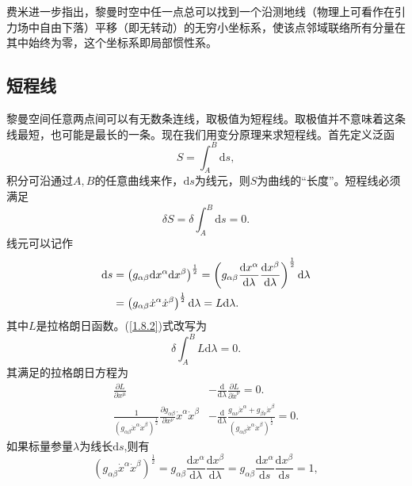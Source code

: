 \documentclass[11pt, a4paper, oneside, onecolumn]{ctexart}
\numberwithin{equation}{subsection}
\begin{document}
费米进一步指出，黎曼时空中任一点总可以找到一个沿测地线（物理上可看作在引力场中自由下落）平移（即无转动）的无穷小坐标系，使该点邻域联络所有分量在其中始终为零，这个坐标系即局部惯性系。

\subsection{短程线}
黎曼空间任意两点间可以有无数条连线，取极值为短程线。取极值并不意味着这条线最短，也可能是最长的一条。现在我们用变分原理来求短程线。首先定义泛函
\begin{equation}
S=\int_{A}^{B}\mathrm{d}s,
\end{equation}
积分可沿通过$A,B$的任意曲线来作，$\mathrm{d}s$为线元，则$S$为曲线的“长度”。短程线必须满足
\begin{equation}
\delta{}S=\delta{}\int_{A}^{B}\mathrm{d}s=0.\label{1.8.2}
\end{equation}
线元可以记作
\begin{align}
\mathrm{d}s&=\left(g_{\alpha\beta}\mathrm{d}x^{\alpha}\mathrm{d}x^{\beta}\right)^{\frac12}=\left(g_{\alpha\beta}\frac{\mathrm{d}x^{\alpha}}{\mathrm{d}\lambda}\frac{\mathrm{d}x^{\beta}}{\mathrm{d}\lambda}\right)^{\frac12}\mathrm{d}\lambda\notag\\
&=\left(g_{\alpha\beta}\dot{x}^{\alpha}\dot{x}^{\beta}\right)^{\frac12}\mathrm{d}\lambda=L\mathrm{d}\lambda.
\end{align}
其中$L$是拉格朗日函数。(\ref{1.8.2})式改写为
\begin{equation}
\delta{}\int_{A}^{B}L\mathrm{d}\lambda=0.
\end{equation}
其满足的拉格朗日方程为
\begin{align}
\frac{\partial{}L}{\partial{}x^{\mu}}&-\frac{\mathrm{d}}{\mathrm{d}\lambda}\frac{\partial{}L}{\partial{}\dot{x}^{\nu}}=0.\\
\frac{1}{\left(g_{\alpha\beta}\dot{x}^{\alpha}\dot{x}^{\beta}\right)^{\frac12}}\frac{\partial{}g_{\alpha\beta}}{\partial{}x^{\nu}}\dot{x}^{\alpha}\dot{x}^{\beta}&-\frac{\mathrm{d}}{\mathrm{d}\lambda}\frac{g_{\alpha\nu}\dot{x}^{\alpha}+g_{\beta\nu}\dot{x}^{\beta}}{\left(g_{\alpha\beta}\dot{x}^{\alpha}\dot{x}^{\beta}\right)^{\frac12}}=0.\label{1.8.6}
\end{align}
如果标量参量$\lambda$为线长$\mathrm{d}s$,则有
\begin{equation}
\left(g_{\alpha\beta}\dot{x}^{\alpha}\dot{x}^{\beta}\right)^{\frac12}=g_{\alpha\beta}\frac{\mathrm{d}x^{\alpha}}{\mathrm{d}\lambda}\frac{\mathrm{d}x^{\beta}}{\mathrm{d}\lambda}=g_{\alpha\beta}\frac{\mathrm{d}x^{\alpha}}{\mathrm{d}s}\frac{\mathrm{d}x^{\beta}}{\mathrm{d}s}=1,
\end{equation}
\end{document}
